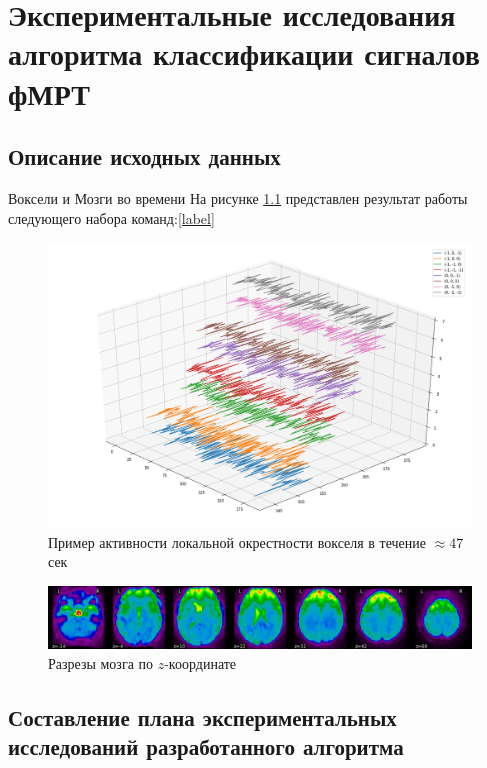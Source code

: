 \chapter{Экспериментальные исследования алгоритма классификации сигналов фМРТ}

\section{Описание исходных данных}





Воксели и Мозги во времени
На рисунке \ref{pic:local_100c} представлен результат работы следующего набора команд:\ref{label}
\begin{figure}%
	\begin{center}
		\includegraphics[width=.7\columnwidth]{./img/local_100c.png}%
	\end{center}
	\caption{Пример активности локальной окрестности вокселя в течение $\approx47$ сек}%
	\label{pic:local_100c}%
\end{figure}

\begin{figure}%
	\begin{center}
		\includegraphics[width=.9\columnwidth]{./img/slices.png}%
	\end{center}
	\caption{Разрезы мозга по $z$-координате}%
	\label{pic:slices}%
\end{figure}

\section{Составление плана экспериментальных исследований разработанного алгоритма}

